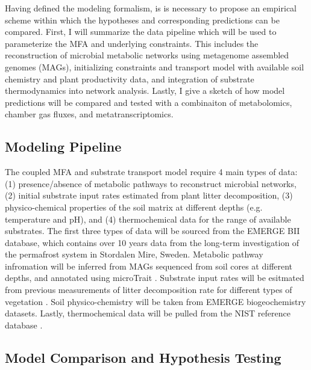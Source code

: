 

Having defined the modeling formalism, is is necessary to propose an empirical scheme within which the hypotheses and corresponding predictions can be compared. First, I will summarize the data pipeline which will be used to parameterize the MFA and underlying constraints. This includes the reconstruction of microbial metabolic networks using metagenome assembled genomes (MAGs), initializing constraints and transport model with available soil chemistry and plant productivity data, and integration of substrate thermodynamics into network analysis. Lastly, I give a sketch of how model predictions will be compared and tested with a combinaiton of metabolomics, chamber gas fluxes, and metatranscriptomics.

\subsection{Modeling Pipeline}

The coupled MFA and substrate transport model require 4 main types of data: (1) presence/absence of metabolic pathways to reconstruct microbial networks, (2) initial substrate input rates estimated from plant litter decomposition, (3) physico-chemical properties of the soil matrix at different depths (e.g. temperature and pH), and (4) thermochemical data for the range of available substrates. The first three types of data will be sourced from the EMERGE BII database, which contains over 10 years data from the long-term investigation of the permafrost system in Stordalen Mire, Sweden. Metabolic pathway infromation will be inferred from MAGs sequenced from soil cores at different depths, and annotated using microTrait \cite{karaoz2022a}. Substrate input rates will be esitmated from previous measurements of litter decomposition rate for different types of vegetation \cite{hough2022a}. Soil physico-chemistry will be taken from EMERGE biogeochemistry datasets. Lastly, thermochemical data will be pulled from the NIST reference database \cite{p_nist_1998}.

\subsection{Model Comparison and Hypothesis Testing}






